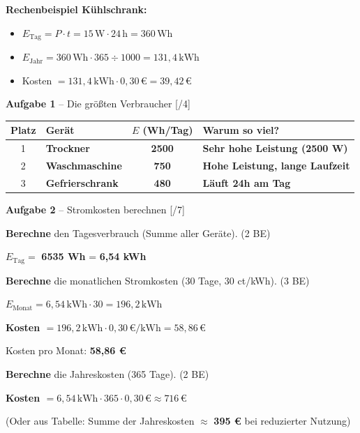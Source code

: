 \documentclass[11pt, a4paper]{article}
\newcommand{\lsg}[1]{\textcolor{loesung}{\textbf{#1}}}
\newcommand{\punktebox}[1]{\hfill\small\textcolor{mittelgrau}{[\hspace{0.8em}/#1]}}
\newcommand{\aufgabe}[2]{%
    \needspace{4\baselineskip}%
    \vspace{10pt}%
    \noindent\textbf{\textcolor{fachfarbe}{Aufgabe #1}} #2%
    \vspace{4pt}%
    \nopagebreak[4]%
}
\newcommand{\operator}[1]{\textbf{#1}}
\begin{document}
\normalsize

\begin{loesungskasten}
\textbf{Rechenbeispiel Kühlschrank:}
\begin{itemize}[nosep, leftmargin=1.5em]
    \item $E_{\text{Tag}} = P \cdot t = 15\,\text{W} \cdot 24\,\text{h} = 360\,\text{Wh}$
    \item $E_{\text{Jahr}} = 360\,\text{Wh} \cdot 365 \div 1000 = 131{,}4\,\text{kWh}$
    \item Kosten $= 131{,}4\,\text{kWh} \cdot 0{,}30\,\text{€} = 39{,}42\,\text{€}$
\end{itemize}
\end{loesungskasten}


\aufgabe{1}{– Die größten Verbraucher} \punktebox{4}

\vspace{0.2em}
\small
\begin{tabular}{|c|l|c|l|}
\hline
\textbf{Platz} & \textbf{Gerät} & \textbf{$E$ (Wh/Tag)} & \textbf{Warum so viel?} \\
\hline
1 & \lsg{Trockner} & \lsg{2500} & \lsg{Sehr hohe Leistung (2500 W)} \\
\hline
2 & \lsg{Waschmaschine} & \lsg{750} & \lsg{Hohe Leistung, lange Laufzeit} \\
\hline
3 & \lsg{Gefrierschrank} & \lsg{480} & \lsg{Läuft 24h am Tag} \\
\hline
\end{tabular}
\normalsize


\aufgabe{2}{– Stromkosten berechnen} \punktebox{7}

\begin{teil}
    \item \operator{Berechne} den Tagesverbrauch (Summe aller Geräte). \hfill (2 BE)

    $E_{\text{Tag}} = $ \lsg{6535 Wh} = \lsg{6,54 kWh}

    \item \operator{Berechne} die monatlichen Stromkosten (30 Tage, 30 ct/kWh). \hfill (3 BE)

    \lsg{$E_{\text{Monat}} = 6{,}54\,\text{kWh} \cdot 30 = 196{,}2\,\text{kWh}$}

    \lsg{Kosten $= 196{,}2\,\text{kWh} \cdot 0{,}30\,\text{€/kWh} = 58{,}86\,\text{€}$}

    Kosten pro Monat: \lsg{58,86 €}

    \item \operator{Berechne} die Jahreskosten (365 Tage). \hfill (2 BE)

    \lsg{Kosten $= 6{,}54\,\text{kWh} \cdot 365 \cdot 0{,}30\,\text{€} \approx 716\,\text{€}$}

    (Oder aus Tabelle: Summe der Jahreskosten $\approx$ \lsg{395 €} bei reduzierter Nutzung)
\end{teil}
\end{document}
